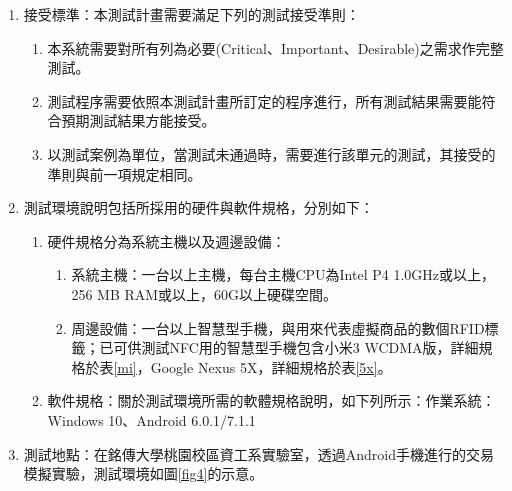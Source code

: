 	 		\begin{enumerate}
	 			
	 			\item 接受標準：本測試計畫需要滿足下列的測試接受準則： 

	 			\begin{enumerate}
					\item 本系統需要對所有列為必要(Critical、Important、Desirable)之需求作完整測試。
					\item 測試程序需要依照本測試計畫所訂定的程序進行，所有測試結果需要能符合預期測試結果方能接受。
					\item 以測試案例為單位，當測試未通過時，需要進行該單元的測試，其接受的準則與前一項規定相同。 
				\end{enumerate}

				\item 測試環境說明包括所採用的硬件與軟件規格，分別如下：
				\begin{enumerate}
					\item 硬件規格分為系統主機以及週邊設備：
					
					\begin{enumerate}
						\item 系統主機：一台以上主機，每台主機CPU為Intel P4 1.0GHz或以上，256 MB RAM或以上，60G以上硬碟空間。
						\item 周邊設備：一台以上智慧型手機，與用來代表虛擬商品的數個RFID標籤；已可供測試NFC用的智慧型手機包含小米3 WCDMA版，詳細規格於表\ref{mi}，Google Nexus 5X，詳細規格於表\ref{5x}。
					
					\end{enumerate}
					\item 軟件規格：關於測試環境所需的軟體規格說明，如下列所示：作業系統：Windows 10、Android 6.0.1/7.1.1

				\end{enumerate}
				\item 測試地點：在銘傳大學桃園校區資工系實驗室，透過Android手機進行的交易模擬實驗，測試環境如圖\ref{fig4}的示意。

	 	


\end{enumerate}
